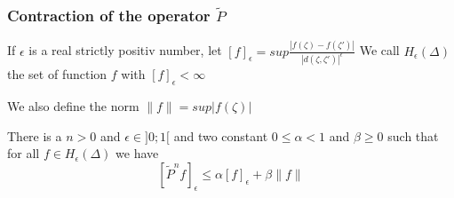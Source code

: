 \subsubsection{Contraction of the operator $\tilde{P}$ }
\begin{dfnt}
If $\epsilon$ is a real strictly positiv number, let $[f]_\epsilon= sup \frac{|f(\zeta)-f(\zeta')|}{|d(\zeta,\zeta')|^\epsilon}$ \newline
We call $H_\epsilon(\Delta)$ the set of function $f$ with $[f]_\epsilon < \infty$
\end{dfnt}
We also define the norm $\| f \|=sup |f(\zeta)|$
\begin{thm}
There is a $n >0$ and $\epsilon \in ]0;1[$ and two constant
 $0 \leq \alpha < 1$ and $\beta \geq 0$ such that for all $f\in H_\epsilon(\Delta)$
 we have \[
[\tilde{P}^n f]_\epsilon \leq \alpha [f]_\epsilon +\beta \| f \|
 \]
 \end{thm}
